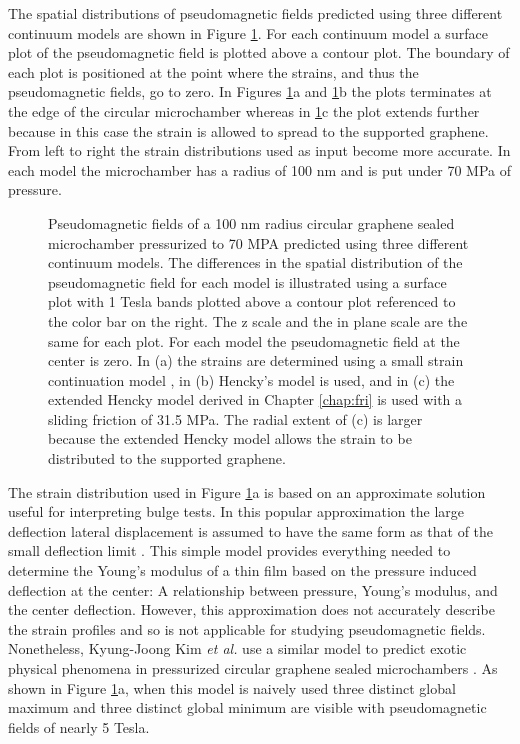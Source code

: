 The spatial distributions of pseudomagnetic fields predicted using three different continuum models are shown in Figure \ref{fig:PVP:circle}.
For each continuum model a surface plot of the pseudomagnetic field is plotted above a contour plot.
The boundary of each plot is positioned at the point where the strains, and thus the pseudomagnetic fields, go to zero.
In Figures \ref{fig:PVP:circle}a and \ref{fig:PVP:circle}b the plots terminates at the edge of the circular microchamber whereas in \ref{fig:PVP:circle}c the plot extends further because in this case the strain is allowed to spread to the supported graphene.
From left to right the strain distributions used as input become more accurate.
In each model the microchamber has a radius of 100 nm and is put under 70 MPa of pressure.

\begin{figure}
  \begin{center}
  
  \end{center}
  \caption[Pseudomagnetic fields predicted by different continuum models]{\label{fig:PVP:circle} Pseudomagnetic fields of a 100 nm radius circular graphene sealed microchamber pressurized to 70 MPA predicted using three different continuum models. The differences in the spatial distribution of the pseudomagnetic field for each model is illustrated using a surface plot with 1 Tesla bands plotted above a contour plot referenced to the color bar on the right. The z scale and the in plane scale are the same for each plot.  For each model the pseudomagnetic field at the center is zero. In (a) the strains are determined using a small strain continuation model \cite{Timoshenko}, in (b) Hencky's model \cite{Hencky1915} is used, and in (c) the extended Hencky model derived in Chapter \ref{chap:fri} is used with a sliding friction of 31.5 MPa.  The radial extent of (c) is larger because the extended Hencky model allows the strain to be distributed to the supported graphene.}
\end{figure}

The strain distribution used in Figure \ref{fig:PVP:circle}a is based on an approximate solution useful for interpreting bulge tests.
In this popular approximation the large deflection lateral displacement is assumed to have the same form as that of the small deflection limit \cite{Timoshenko}.
This simple model provides everything needed to determine the Young's modulus of a thin film based on the pressure induced deflection at the center: A relationship between pressure, Young's modulus, and the center deflection.
However, this approximation does not accurately describe the strain profiles and so is not applicable for studying pseudomagnetic fields.
Nonetheless, Kyung-Joong Kim \textit{et al.} use a similar model to predict exotic physical phenomena in pressurized circular graphene sealed microchambers \cite{Kim2011b}.
As shown in Figure \ref{fig:PVP:circle}a, when this model is naively used three distinct global maximum and three distinct global minimum are visible with pseudomagnetic fields of nearly 5 Tesla.

